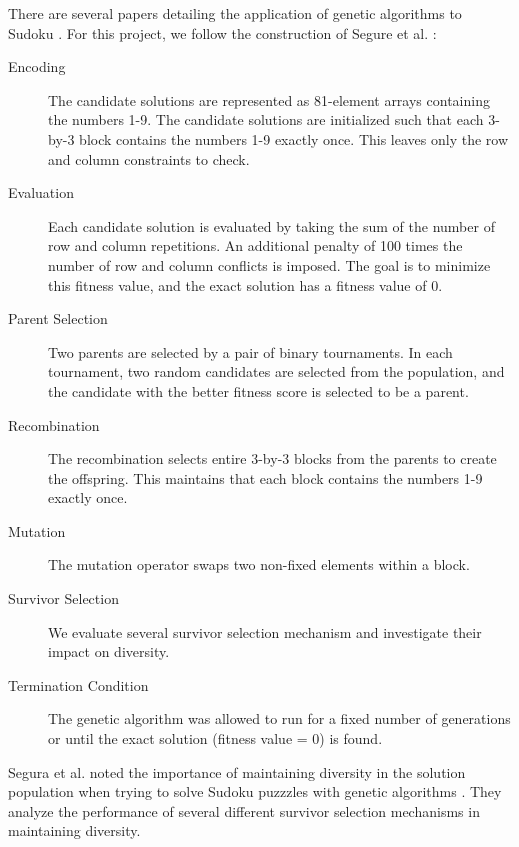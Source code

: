 \documentclass[english]{article}
\begin{document}
There are several papers detailing the application of genetic algorithms to Sudoku \cite{mantere2006solving,sato2010solving,segura2016importance,weiss2009genetic}. For this project, we follow the construction of Segure et al. \cite{segura2016importance}:
\begin{description}
\item[Encoding] The candidate solutions are represented as 81-element arrays containing the numbers 1-9. The candidate solutions are initialized such that each 3-by-3 block contains  the numbers 1-9 exactly once. This leaves only the row and column constraints to check. 
\item[Evaluation] Each candidate solution is evaluated by taking the sum of the number of row and column repetitions. An additional penalty of 100 times the number of row and column conflicts is imposed. The goal is to minimize this fitness value, and the exact solution has a fitness value of 0. 
\item[Parent Selection] Two parents are selected by a pair of binary tournaments. In each tournament, two random candidates are selected from the population, and the candidate with the better fitness score is selected to be a parent.
\item[Recombination] The recombination selects entire 3-by-3 blocks from the parents to create the offspring. This maintains that each block contains the numbers 1-9 exactly once.
\item[Mutation] The mutation operator swaps two non-fixed elements within a block.
\item[Survivor Selection] We evaluate several survivor selection mechanism and investigate their impact on diversity.
\item[Termination Condition] The genetic algorithm was allowed to run for a fixed number of generations or until the exact solution (fitness value = 0) is found.
\end{description}
Segura et al. noted the importance of maintaining diversity in the solution population when trying to solve Sudoku puzzzles with genetic algorithms \cite{segura2016importance}. They analyze the performance of several different survivor selection mechanisms in maintaining diversity.
\end{document}
